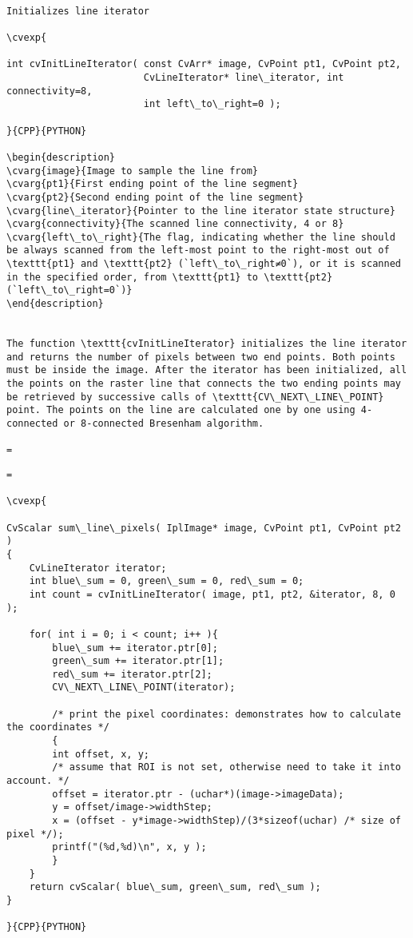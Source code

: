 \begin{verbatim}

Initializes line iterator

\cvexp{

int cvInitLineIterator( const CvArr* image, CvPoint pt1, CvPoint pt2,
                        CvLineIterator* line\_iterator, int connectivity=8,
                        int left\_to\_right=0 );

}{CPP}{PYTHON}

\begin{description}
\cvarg{image}{Image to sample the line from}
\cvarg{pt1}{First ending point of the line segment}
\cvarg{pt2}{Second ending point of the line segment}
\cvarg{line\_iterator}{Pointer to the line iterator state structure}
\cvarg{connectivity}{The scanned line connectivity, 4 or 8}
\cvarg{left\_to\_right}{The flag, indicating whether the line should be always scanned from the left-most point to the right-most out of \texttt{pt1} and \texttt{pt2} (`left\_to\_right≠0`), or it is scanned in the specified order, from \texttt{pt1} to \texttt{pt2} (`left\_to\_right=0`)}
\end{description}


The function \texttt{cvInitLineIterator} initializes the line iterator and returns the number of pixels between two end points. Both points must be inside the image. After the iterator has been initialized, all the points on the raster line that connects the two ending points may be retrieved by successive calls of \texttt{CV\_NEXT\_LINE\_POINT} point. The points on the line are calculated one by one using 4-connected or 8-connected Bresenham algorithm.

=\end{verbatim}
\begin{verbatim}=

\cvexp{

CvScalar sum\_line\_pixels( IplImage* image, CvPoint pt1, CvPoint pt2 )
{
    CvLineIterator iterator;
    int blue\_sum = 0, green\_sum = 0, red\_sum = 0;
    int count = cvInitLineIterator( image, pt1, pt2, &iterator, 8, 0 );

    for( int i = 0; i < count; i++ ){
        blue\_sum += iterator.ptr[0];
        green\_sum += iterator.ptr[1];
        red\_sum += iterator.ptr[2];
        CV\_NEXT\_LINE\_POINT(iterator);

        /* print the pixel coordinates: demonstrates how to calculate the coordinates */
        {
        int offset, x, y;
        /* assume that ROI is not set, otherwise need to take it into account. */
        offset = iterator.ptr - (uchar*)(image->imageData);
        y = offset/image->widthStep;
        x = (offset - y*image->widthStep)/(3*sizeof(uchar) /* size of pixel */);
        printf("(%d,%d)\n", x, y );
        }
    }
    return cvScalar( blue\_sum, green\_sum, red\_sum );
}

}{CPP}{PYTHON}


\end{verbatim}
